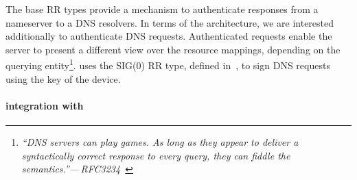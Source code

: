 The base \dnssec RR types  provide a mechanism to authenticate responses from a
nameserver to a DNS resolvers. In terms of the \signpost architecture, we are
interested additionally to authenticate DNS requests. Authenticated requests
enable the server to present a different view over the resource mappings,
depending on the querying entity\footnote{{\em ``DNS servers can play games.  As
    long as they appear to deliver a syntactically correct response to every
    query, they can fiddle the semantics.''---\,RFC3234~}}.
\signpost uses the SIG(0) RR type, defined in~, to sign DNS
requests using the key of the device.  



\paragraph{\signpost integration with \dnssec} 

